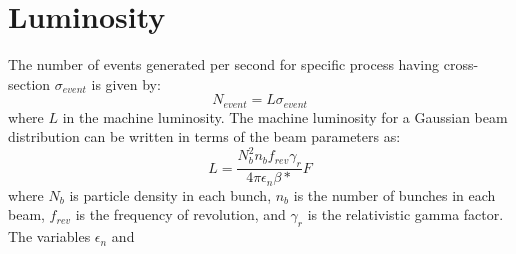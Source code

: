 \section{Luminosity} 
The number of events generated per second for specific process having cross-section $\sigma_{event}$ is given by:
\begin{equation}
N_{event} = L\sigma_{event}
\end{equation}
where $L$ in the machine luminosity.  The machine luminosity for a Gaussian beam distribution can be written in terms of the beam parameters as:
\begin{equation}
L = \frac{N^{2}_{b}n_{b}f_{rev}\gamma_{r}}{4\pi\epsilon_{n}\beta*}F
\end{equation}
where $N_{b}$ is particle density in each bunch, $n_{b}$ is the number of bunches in each beam, $f_{rev}$ is the frequency of revolution, and $\gamma_{r}$ is the relativistic gamma factor.  The variables $\epsilon_{n}$ and 




